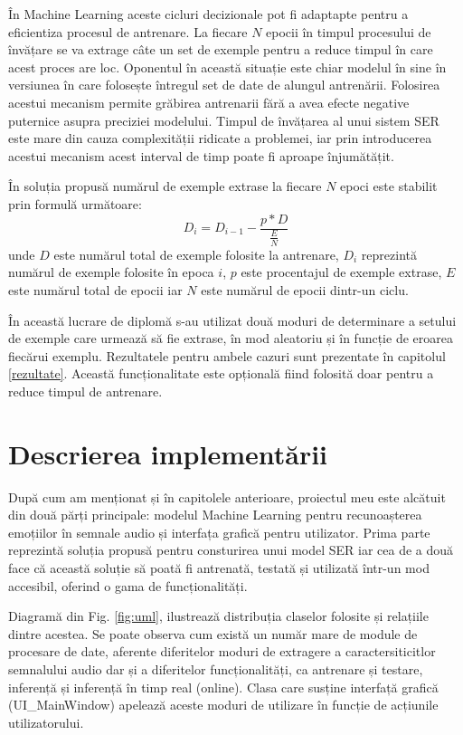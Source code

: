 \documentclass[a4paper,12pt]{book}
\begin{document}
				 În Machine Learning aceste cicluri decizionale pot fi adaptapte pentru a eficientiza procesul de antrenare. La fiecare $N$ epocii în timpul procesului de învățare se va extrage câte un set de exemple pentru a reduce timpul în care acest proces are loc. Oponentul în această situație este chiar modelul în sine în versiunea în care folosește întregul set de date de alungul antrenării.  Folosirea acestui mecanism permite grăbirea antrenarii fără a avea efecte negative puternice asupra preciziei modelului. Timpul de învățarea al unui sistem SER este mare din cauza complexității ridicate a problemei, iar prin introducerea acestui mecanism acest interval de timp poate fi aproape înjumătățit. \par
				 
				 În soluția propusă numărul de exemple extrase la fiecare $N$ epoci este stabilit prin formulă următoare:
				 \begin{equation}
				 	D_i = D_{i-1} - \frac{p * D}{\frac{E}{N}}
				 \end{equation}
				  unde $D$ este numărul total de exemple folosite la antrenare, $D_i$ reprezintă numărul de exemple folosite în epoca $i$, $p$ este procentajul de exemple extrase, $E$ este numărul total de epocii iar $N$ este numărul de epocii dintr-un ciclu. \par
				 În această lucrare de diplomă s-au utilizat două moduri de determinare a setului de exemple care urmează să fie extrase, în mod aleatoriu și în funcție de eroarea fiecărui exemplu. Rezultatele pentru ambele cazuri sunt prezentate în capitolul \ref{rezultate}. Această funcționalitate este opțională fiind folosită doar pentru a reduce timpul de antrenare.
		\chapter{Descrierea implementării}
				După cum am menționat și în capitolele anterioare, proiectul meu este alcătuit din două părți principale: modelul Machine Learning pentru recunoașterea emoțiilor în semnale audio și interfața grafică pentru utilizator. Prima parte reprezintă soluția propusă pentru consturirea unui model SER iar cea de a două face că această soluție să poată fi antrenată, testată și utilizată într-un mod accesibil, oferind o gama de funcționalități.\par 
				Diagramă din Fig. \ref{fig:uml}, ilustrează distribuția claselor folosite și relațiile dintre acestea. Se poate observa cum există un număr mare de module de procesare de date, aferente diferitelor moduri de extragere a caractersiticitlor semnalului audio dar și a diferitelor funcționalități, ca antrenare și testare, inferență și inferență în timp real (online). Clasa care susține interfață grafică (UI\_MainWindow) apelează aceste moduri de utilizare în funcție de acțiunile utilizatorului. \par
				
\end{document}
